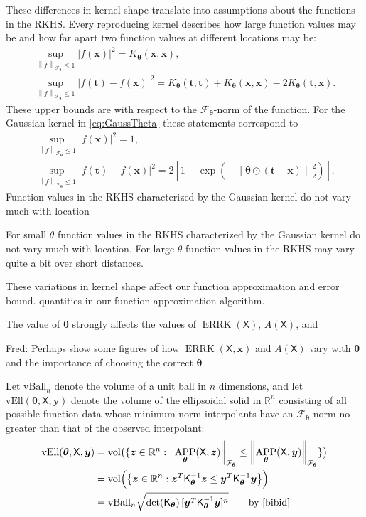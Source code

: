 \documentclass[]{mcom-l}
\theoremstyle{plain}
\theoremstyle{definition}
\newcommand{\vBall}{\text{vBall}_n}
\newcommand{\vEll}{\text{vEll}}
\DeclareMathOperator{\vol}{vol}
\DeclareMathOperator{\errK}{ERRK}
\DeclareMathOperator{\APP}{APP}
\newcommand{\reals}{{\mathbb{R}}}
\newcommand{\mK}{\mathsf{K}}
\newcommand{\mX}{\mathsf{X}}
\newcommand{\bx}{{\boldsymbol{x}}}
\newcommand{\by}{{\boldsymbol{y}}}
\newcommand{\bt}{{\boldsymbol{t}}}
\newcommand{\bz}{{\boldsymbol{z}}}
\newcommand{\btheta}{{\boldsymbol{\theta}}}
\newcommand{\calf}{{\mathcal{F}}}
\def\abs#1{\ensuremath{\left \lvert #1 \right \rvert}}
\newcommand{\norm}[2][{}]{\ensuremath{\left \lVert #2 \right \rVert}_{#1}}
\newcommand{\FredNote}[1]{{\color{blue}Fred: #1}}
\begin{document}
These differences in kernel shape translate into assumptions about the functions in the RKHS.  Every reproducing kernel describes how large function values may be and how far apart two function values at different locations may be:
\begin{subequations} \label{eq:diff_f}
\begin{gather}
\sup_{\norm[\calf_{\btheta}]{f} \le 1} \abs{f(\bx)}^2 = K_\btheta(\bx,\bx), \\   
\sup_{\norm[\calf_{\btheta}]{f} \le 1} \abs{f(\bt) - f(\bx)}^2 = K_{\btheta}(\bt,\bt) +  K_{\btheta}(\bx,\bx) - 2 K_{\btheta}(\bt,\bx).
\end{gather}
\end{subequations}
These upper bounds are with respect to the $\calf_\btheta$-norm of the function.  For the Gaussian kernel in \eqref{eq:GaussTheta} these statements correspond to 
\begin{subequations} \label{eq:diff_f_Gauss}
	\begin{gather}
\sup_{\norm[\calf_{\btheta}]{f} \le 1} \abs{f(\bx)}^2 = 1, \\ 
\sup_{\norm[\calf_{\btheta}]{f} \le 1} \abs{f(\bt) - f(\bx)}^2 = 2[1 -  \exp(-\norm[2]{\btheta \odot (\bt-\bx)}^2)].
\end{gather}
\end{subequations}
Function values in the RKHS characterized by the Gaussian kernel do not vary much with location 


For small $\theta$ function values in the RKHS characterized by the Gaussian kernel do not vary much with location. For large $\theta$ function values in the RKHS may vary quite a bit over short distances.

These variations in kernel shape affect our function approximation and error bound. quantities in our function approximation algorithm.


The value of $\btheta$ strongly affects the values of $\errK(\mX)$, $A(\mX)$, and 

\FredNote{Perhaps show some figures of how $\errK(\mX,\bx)$ and $A(\mX)$ vary with $\btheta$ and the importance of choosing the correct $\btheta$}

Let $\vBall$ denote the volume of a unit ball in $n$ dimensions, and let $\vEll(\btheta,\mX,\by)$ denote the volume of the ellipsoidal solid in $\reals^n$ consisting of all possible function data whose minimum-norm interpolants have an $\calf_{\btheta}$-norm no greater than that of the observed interpolant:
\begin{align*}
\vEll(\btheta,\mX,\by) &= \vol\bigl(\{ \bz \in \reals^n : \norm[\calf_{\btheta}]{\APP_{\btheta}(\mX,\bz)}  \le \norm[\calf_{\btheta}]{\APP_{\btheta}(\mX,\by)} \} \bigr) \\
& = \vol\Bigl( \bigl \{ \bz \in \reals^n : \bz^T \mK_\btheta^{-1} \bz \le \by^T \mK_\btheta^{-1} \by  \bigr \} \Bigr) \\
& = \vBall \sqrt{\det(\mK_{\btheta})  \, [\by^T \mK_\btheta^{-1} \by]^n } \qquad \text{by \cite{bibid}}
\end{align*}
\end{document}
